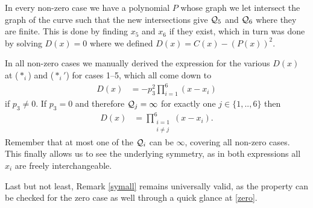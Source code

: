 \documentclass[english,11pt,a4paper]{article}
\begin{document}
\begin{remark}\label{remD}
  In every non-zero case we have a polynomial $P$ whose graph we let intersect the graph of the curve such that the new intersections give $\mathcal{Q}_5$ and $\mathcal{Q}_6$ where they are finite. This is done by finding $x_5$ and $x_6$ if they exist, which in turn was done by solving $D(x) = 0$ where we defined $D(x) = C(x) - (P(x))^2$.

  In all non-zero cases we manually derived the expression for the various $D(x)$ at ($*_i$) and ($*_i'$) for cases 1--5, which all come down to
  \begin{align*}
    D(x) &= -p_3^2\prod_{i=1}^6(x-x_i)
  \end{align*}
  if $p_3 \neq 0$. If $p_3 = 0$ and therefore $\mathcal{Q}_j = \infty$ for exactly one $j \in \{1,..,6\}$ then
  \begin{align*}
    D(x) &=  \prod_{\substack{i=1\\i \neq j}}^6(x-x_i).
  \end{align*}
  Remember that at most one of the $\mathcal{Q}_i$ can be $\infty$, covering all non-zero cases. This finally allows us to see the underlying symmetry, as in both expressions all $x_i$ are freely interchangeable. 
\end{remark}
Last but not least, Remark \ref{symall} remains universally valid, as the property can be checked for the zero case as well through a quick glance at \eqref{zero}.







\end{document}
